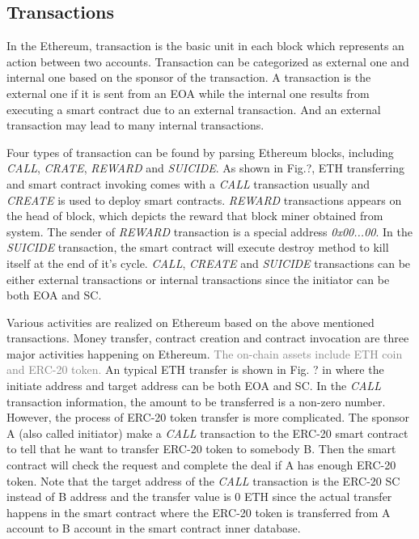 


\subsection{Transactions}
In the Ethereum, transaction is the basic unit in each block which represents an action between two accounts. Transaction can be categorized as external one and internal one based on the sponsor of the transaction. A transaction is the external one if it is sent from an EOA while the internal one results from executing a smart contract due to an external transaction. And an external transaction may lead to many internal transactions\cite{chen2018infocom}.

Four types of transaction can be found by parsing Ethereum blocks, including \emph{CALL}, \emph{CRATE}, \emph{REWARD} and \emph{SUICIDE}. As shown in Fig.?, ETH transferring and smart contract invoking comes with a \emph{CALL} transaction usually and \emph{CREATE} is used to deploy smart contracts. \emph{REWARD} transactions appears on the head of block, which depicts the reward that block miner obtained from system. The sender of \emph{REWARD} transaction is a special address \emph{0x00...00}. In the \emph{SUICIDE} transaction, the smart contract will execute destroy method to kill itself at the end of it's cycle. \emph{CALL}, \emph{CREATE} and \emph{SUICIDE} transactions can be either external transactions or internal transactions since the initiator can be both EOA and SC.

Various activities are realized on Ethereum based on the above mentioned transactions. Money transfer, contract creation and contract invocation are three major activities happening on Ethereum\cite{chen2018infocom}. \textcolor{gray}{The on-chain assets include ETH coin and ERC-20 token.} An typical ETH transfer is shown in Fig. ? in where the initiate address and target address can be both EOA and SC. In the \emph{CALL} transaction information, the amount to be transferred is a non-zero number. However, the process of ERC-20 token transfer is more complicated. The sponsor A (also called initiator) make a \emph{CALL} transaction to the ERC-20 smart contract to tell that he want to transfer ERC-20 token to somebody B. Then the smart contract will check the request and complete the deal if A has enough ERC-20 token. Note that the target address of the \emph{CALL} transaction is the ERC-20 SC instead of B address and the transfer value is $0$ ETH since the actual transfer happens in the smart contract where the ERC-20 token is transferred from A account to B account in the smart contract inner database. 


